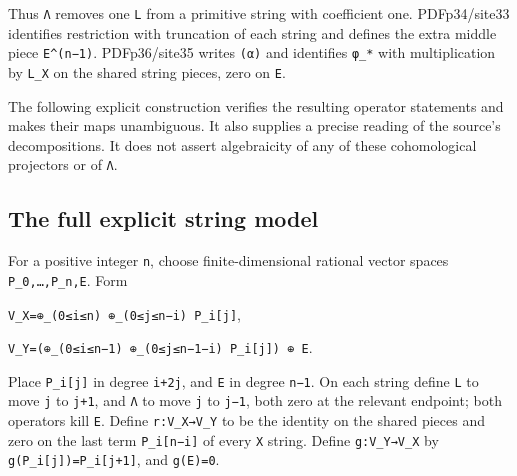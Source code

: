 \documentclass[
  10pt,
]{article}
\begin{document}
Thus \texttt{\small Λ} removes one \texttt{\small L} from a primitive
string with coefficient one. PDFp34/site33 identifies restriction with
truncation of each string and defines the extra middle piece
\texttt{\small E\textasciicircum{}(\allowbreak{}n−1)\allowbreak{}}.
PDFp36/site35 writes \texttt{\small (\allowbreak{}α)\allowbreak{}} and
identifies \texttt{\small φ\_\allowbreak{}*} with multiplication by
\texttt{\small L\_\allowbreak{}X} on the shared string pieces, zero on
\texttt{\small E}.

The following explicit construction verifies the resulting operator
statements and makes their maps unambiguous. It also supplies a precise
reading of the source's decompositions. It does not assert algebraicity
of any of these cohomological projectors or of \texttt{\small Λ}.

\subsection{The full explicit string
model}\label{the-full-explicit-string-model}

For a positive integer \texttt{\small n}, choose finite-dimensional
rational vector spaces
\texttt{\small P\_\allowbreak{}0,\allowbreak{}…,\allowbreak{}P\_\allowbreak{}n,\allowbreak{}E}.
Form

\texttt{\small V\_\allowbreak{}X=\allowbreak{}⊕\allowbreak{}\_\allowbreak{}(\allowbreak{}0≤\allowbreak{}i≤\allowbreak{}n)\allowbreak{} ⊕\allowbreak{}\_\allowbreak{}(\allowbreak{}0≤\allowbreak{}j≤\allowbreak{}n−i)\allowbreak{} P\_\allowbreak{}i[\allowbreak{}j]\allowbreak{}},

\texttt{\small V\_\allowbreak{}Y=\allowbreak{}(\allowbreak{}⊕\allowbreak{}\_\allowbreak{}(\allowbreak{}0≤\allowbreak{}i≤\allowbreak{}n−1)\allowbreak{} ⊕\allowbreak{}\_\allowbreak{}(\allowbreak{}0≤\allowbreak{}j≤\allowbreak{}n−1−i)\allowbreak{} P\_\allowbreak{}i[\allowbreak{}j]\allowbreak{})\allowbreak{} ⊕\allowbreak{} E}.

Place \texttt{\small P\_\allowbreak{}i[\allowbreak{}j]\allowbreak{}} in
degree \texttt{\small i+\allowbreak{}2j}, and \texttt{\small E} in
degree \texttt{\small n−1}. On each string define \texttt{\small L} to
move \texttt{\small j} to \texttt{\small j+\allowbreak{}1}, and
\texttt{\small Λ} to move \texttt{\small j} to \texttt{\small j−1}, both
zero at the relevant endpoint; both operators kill \texttt{\small E}.
Define
\texttt{\small r:\allowbreak{}V\_\allowbreak{}X→\allowbreak{}V\_\allowbreak{}Y}
to be the identity on the shared pieces and zero on the last term
\texttt{\small P\_\allowbreak{}i[\allowbreak{}n−i]\allowbreak{}} of
every \texttt{\small X} string. Define
\texttt{\small g:\allowbreak{}V\_\allowbreak{}Y→\allowbreak{}V\_\allowbreak{}X}
by
\texttt{\small g(\allowbreak{}P\_\allowbreak{}i[\allowbreak{}j]\allowbreak{})\allowbreak{}=\allowbreak{}P\_\allowbreak{}i[\allowbreak{}j+\allowbreak{}1]\allowbreak{}},
and \texttt{\small g(\allowbreak{}E)\allowbreak{}=\allowbreak{}0}.
\end{document}
